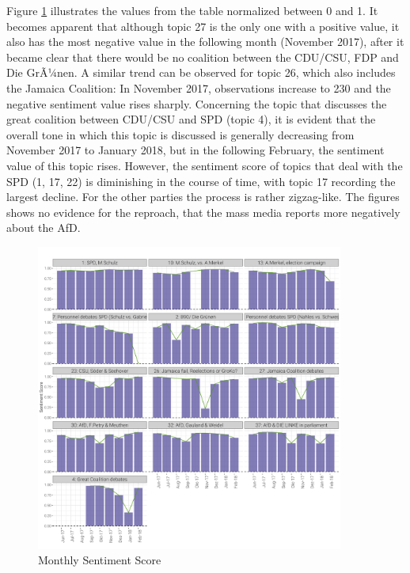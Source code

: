 \documentclass[12pt,a4paper,notitlepage]{article}
\begin{document}
Figure \ref{fig_sentscore_monthly} illustrates the values from the table normalized between 0 and 1. It becomes apparent that although topic 27 is the only one with a positive value, it also has the most negative value in the following month (November 2017), after it became clear that there would be no coalition between the CDU/CSU, FDP and Die GrÃ¼nen. A similar trend can be observed for topic 26, which also includes the Jamaica Coalition: In November 2017, observations increase to 230 and the negative sentiment value rises sharply. Concerning the topic that discusses the great coalition between CDU/CSU and SPD (topic 4), it is evident that the overall tone in which this topic is discussed is generally decreasing from November 2017 to January 2018, but in the following February, the sentiment value of this topic rises. However, the sentiment score of topics that deal with the SPD (1, 17, 22) is diminishing in the course of time, with topic 17 recording the largest decline. For the other parties the process is rather zigzag-like. The figures shows no evidence for the reproach, that the mass media reports more negatively about the AfD.

\begin{figure}[H]
	\caption{Monthly Sentiment Score}
		\begin{center}
			\includegraphics[width=0.9\textwidth,keepaspectratio]{figs/sentscore_monthly.png}
		\end{center}
	\label{fig_sentscore_monthly}
\end{figure}
\end{document}
